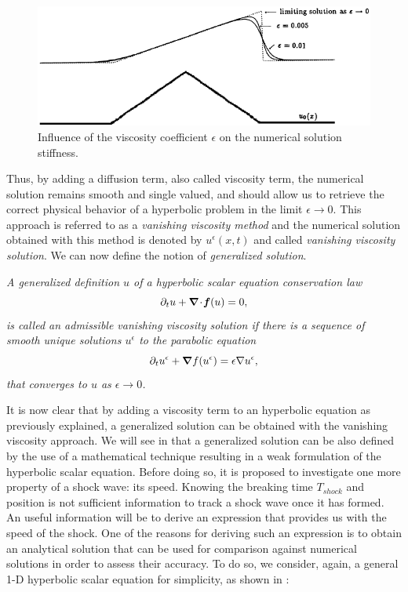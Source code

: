%
\begin{figure}[H]
\centering
\includegraphics[width=\textwidth]{figures/effect_of_epsilon.png}
\caption{Influence of the viscosity coefficient $\epsilon$ on the numerical solution stiffness.}
\label{fig:epsilon}
\end{figure}
%
Thus, by adding a diffusion term, also called viscosity term, the numerical solution remains smooth and single valued, and should allow us to retrieve the correct physical behavior of a hyperbolic problem in the limit $\epsilon \to 0$. This approach is referred to as a \emph{vanishing viscosity method} and the numerical solution obtained with this method is denoted by $u^{\epsilon}(x,t)$ and called \emph{vanishing viscosity solution}. We can now define the notion of \emph{generalized solution}. 
%
\begin{definition}
\emph{
A generalized definition $u$ of a hyperbolic scalar equation conservation law 
\begin{equation}
\partial_t u + \boldsymbol{\nabla}\! \cdot \! \boldsymbol f(u) = 0, \nonumber
\end{equation}
is called an admissible vanishing viscosity solution if there is a sequence of smooth unique solutions $u^{\epsilon}$ to the parabolic equation 
\begin{equation}
\partial_t u^{\epsilon} +  \boldsymbol{\nabla} f(u^{\epsilon}) = \epsilon \nabla u^{\epsilon}, \nonumber
\end{equation}
that converges to $u$ as $\epsilon \to 0$.}
\end{definition}
%
It is now clear that by adding a viscosity term to an hyperbolic equation as previously explained, a generalized solution can be obtained with the vanishing viscosity approach. We will see in  that a generalized solution can be also defined by the use of a mathematical technique resulting in a weak formulation of the hyperbolic scalar equation. Before doing so, it is proposed to investigate one more property of a shock wave: its speed. Knowing the breaking time $T_{shock}$ and position is not sufficient information to track a shock wave once it has formed. An useful information will be to derive an expression that provides us with the speed of the shock. One of the reasons for deriving such an expression is to obtain an analytical solution that can be used for comparison against numerical solutions in order to assess their accuracy. To do so, we consider, again, a general 1-D hyperbolic scalar equation for simplicity, as shown in :
